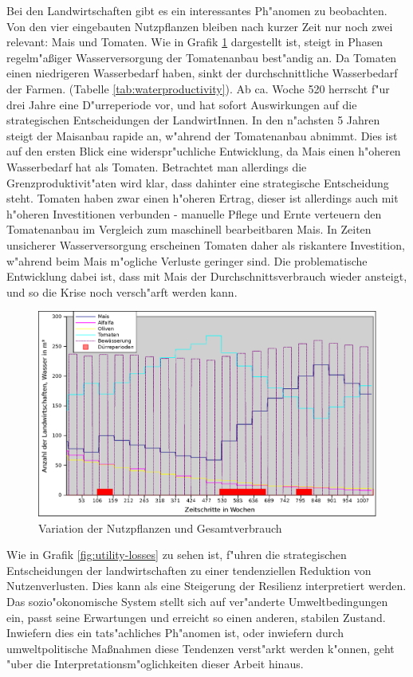 \documentclass[11pt,a4paper]{article}
\begin{document}
Bei den Landwirtschaften gibt es ein interessantes Ph"anomen zu beobachten. Von den vier eingebauten Nutzpflanzen bleiben nach kurzer Zeit nur noch zwei relevant: Mais und Tomaten. Wie in Grafik \ref{fig:crop-types} dargestellt ist, steigt in Phasen regelm"aßiger Wasserversorgung der Tomatenanbau best"andig an. Da Tomaten einen niedrigeren Wasserbedarf haben, sinkt der durchschnittliche Wasserbedarf der Farmen. (Tabelle \ref{tab:waterproductivity}). Ab ca. Woche 520 herrscht f"ur drei Jahre eine D"urreperiode vor, und hat sofort Auswirkungen auf die strategischen Entscheidungen der LandwirtInnen. In den n"achsten 5 Jahren steigt der Maisanbau rapide an, w"ahrend der Tomatenanbau abnimmt. Dies ist auf den ersten Blick eine widerspr"uchliche Entwicklung, da Mais einen h"oheren Wasserbedarf hat als Tomaten. Betrachtet man allerdings die Grenzproduktivit"aten wird klar, dass dahinter eine strategische Entscheidung steht. Tomaten haben zwar einen h"oheren Ertrag, dieser ist allerdings auch mit h"oheren Investitionen verbunden - manuelle Pflege und Ernte verteuern den Tomatenanbau im Vergleich zum maschinell bearbeitbaren Mais. In Zeiten unsicherer Wasserversorgung erscheinen Tomaten daher als riskantere Investition, w"ahrend beim Mais m"ogliche Verluste geringer sind. Die problematische Entwicklung dabei ist, dass mit Mais der Durchschnittsverbrauch wieder ansteigt, und so die Krise noch versch"arft werden kann.

\begin{figure}[h]
\centering
\includegraphics[width=\textwidth]{./crop-types}
\caption{Variation der Nutzpflanzen und Gesamtverbrauch}
\label{fig:crop-types}
\end{figure}

Wie in Grafik \ref{fig:utility-losses} zu sehen ist, f"uhren die strategischen Entscheidungen der landwirtschaften zu einer tendenziellen Reduktion von Nutzenverlusten. Dies kann als eine Steigerung der Resilienz interpretiert werden. Das sozio"okonomische System stellt sich auf ver"anderte Umweltbedingungen ein, passt seine Erwartungen und erreicht so einen anderen, stabilen Zustand. Inwiefern dies ein tats"achliches Ph"anomen ist, oder inwiefern durch umweltpolitische Maßnahmen diese Tendenzen verst"arkt werden k"onnen, geht "uber die Interpretationsm"oglichkeiten dieser Arbeit hinaus. 
\end{document}

